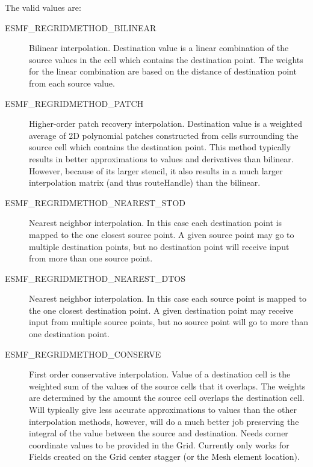 The valid values are:
\begin{description}
\item [ESMF\_REGRIDMETHOD\_BILINEAR]
      Bilinear interpolation. Destination value is a linear combination of the source values in the cell which contains the destination point. The weights for the linear combination are based on the distance of destination point from each source value. 
\item [ESMF\_REGRIDMETHOD\_PATCH]
      Higher-order patch recovery interpolation. Destination value is a weighted average of 2D polynomial patches constructed from cells surrounding the source cell which contains the destination point. This method typically results in better approximations to values and derivatives than bilinear. However, because of its larger stencil, it also results in a much larger interpolation matrix (and thus routeHandle) than the bilinear. 
\item [ESMF\_REGRIDMETHOD\_NEAREST\_STOD]
      Nearest neighbor interpolation. In this case each destination point is mapped to the one closest source point. A given source point may go to multiple destination points, but no destination point will receive input from more than one source point. 
\item [ESMF\_REGRIDMETHOD\_NEAREST\_DTOS]
      Nearest neighbor interpolation. In this case each source point is mapped to the one closest destination point. A given destination point may receive input from multiple source points, but no source point will go to more than one destination point. 
\item [ESMF\_REGRIDMETHOD\_CONSERVE]
      First order conservative interpolation. Value of a destination cell is the weighted sum of the values of the source cells that it overlaps. The weights are determined by the amount the source cell overlaps the destination cell. Will typically give less accurate approximations to values than the other interpolation methods, however, will do a much better job preserving the integral of the value between the source and destination.  Needs corner coordinate values to be provided in the Grid. Currently only works for Fields created on the Grid center stagger (or the Mesh element location). 
\end{description}
